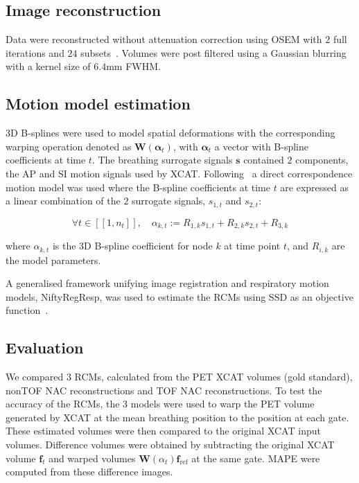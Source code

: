 \documentclass[10pt,twocolumn,twoside,letterpaper]{IEEEtran}
\begin{document}
\subsection{Image reconstruction}
Data were reconstructed without attenuation correction using \gls{OSEM} with $2$ full iterations and $24$ subsets~\cite{Hudson1994}. Volumes were post filtered using a Gaussian blurring with a kernel size of $6.4$mm \gls{FWHM}.

\subsection{Motion model estimation}
3D B-splines were used to model spatial deformations with the corresponding warping operation denoted as $\mathbf{W}(\mathbf{\alpha}_t)$, with $\mathbf{\alpha}_t$ a vector with B-spline coefficients at time $t$. The breathing surrogate signals $\mathbf{s}$ contained $2$ components, the \gls{AP} and \gls{SI} motion signals used by \gls{XCAT}.  Following~\cite{McClelland2017} a direct correspondence motion model was used where the B-spline coefficients at time $t$ are expressed as a linear combination of the $2$ surrogate signals, $s_{1,t}$ and $s_{2,t}$:

\begin{equation}
    \forall t \in [[1,n_t]],\quad \alpha_{k,t} := R_{1,k} s_{1,t} + R_{2,k} s_{2,t} + R_{3,k}
\end{equation}

\noindent where $\alpha_{k,t}$ is the 3D B-spline coefficient for node $k$ at time point $t$, and $R_{i,k}$ are the model parameters.

A generalised framework unifying image registration and respiratory motion models, NiftyRegResp, was used to estimate the \gls{RCM}s %
using \gls{SSD} as an objective function~\cite{McClelland2017}.

\subsection{Evaluation}
We compared $3$ \gls{RCM}s, calculated from the \gls{PET} \gls{XCAT} volumes (gold standard), \gls{nonTOF} \gls{NAC} reconstructions and \gls{TOF} \gls{NAC} reconstructions. To test the accuracy of the \gls{RCM}s, the $3$ models were used to warp the \gls{PET} volume generated by \gls{XCAT} at the mean breathing position to the position at each gate. These estimated volumes were then compared to the original \gls{XCAT} input volumes. Difference volumes were obtained by subtracting the original \gls{XCAT} volume $\mathbf{f}_t$ and warped volumes $\mathbf{W}(\alpha_t) \mathbf{f}_\mathrm{ref}$ at the same gate. \gls{MAPE} were computed from these difference images.
\end{document}

